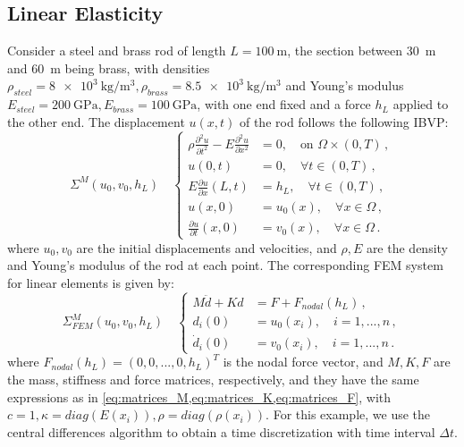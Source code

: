 \documentclass[letterpaper, 10 pt, conference]{ieeeconf/ieeeconf}
\begin{document}
\subsection{Linear Elasticity}
\label{sub:linear_elasticity}

Consider a steel and brass rod of length $L = \SI{100}{\m}$, the section between 
\SI{30}{\m} and \SI{60}{\m} being brass, with densities $\rho_{steel} =
\SI{8e3}{\kg\per\m^3}, \rho_{brass} = \SI{8.5e3}{\kg\per\m^3}$ and Young's
modulus $E_{steel} = \SI{200}{\giga\pascal}, E_{brass} =
\SI{100}{\giga\pascal}$,
with one end fixed and a force $h_L$ applied to the
other end. The displacement $u(x, t)$ of the rod follows the following IBVP:
%
\begin{equation}\label{eq:pde_mech}
    \Sigma^{M}(u_0, v_0, h_L) \quad \left \{
    \begin{aligned}
        \rho \frac{\partial^2 u}{\partial t^2} - E \frac{\partial^2
        u}{\partial x^2} &= 0, \quad \text{on } \Omega \times (0, T) \,, \\
        u(0, t) &= 0, \quad \forall t \in (0, T) \,, \\
        E \frac{\partial u}{\partial x}(L, t) &= h_L, \quad 
        \forall t \in (0, T) \,, \\
        u(x, 0) &= u_0(x), \quad \forall x \in \Omega \,, \\
        \frac{\partial u}{\partial t}(x, 0) &= v_0(x), \quad \forall x \in \Omega \,.
    \end{aligned}
    \right.
\end{equation}
%
where $u_0, v_0$ are the initial displacements and velocities, and $\rho, E$ are
the density and Young's modulus of the rod at each point.
The corresponding FEM system for linear elements is given by:
%
\begin{equation}\label{eq:fem_mech}
    \Sigma^M_{FEM}(u_0, v_0, h_L) \quad \left \{
    \begin{aligned}
        M\ddot{d} + K d &= F + F_{nodal}(h_L) \,, \\
        d_i(0) &= u_0(x_i), \quad i = 1,...,n \,, \\
        \dot{d}_i(0) &= v_0(x_i), \quad i = 1,...,n \,.
    \end{aligned}
    \right.
\end{equation}
%
where $F_{nodal}(h_L) = (0, 0, ..., 0, h_L)^T$ is the nodal force vector, and $M, K, F$ 
are the mass, stiffness and force matrices, respectively, and
they have the same expressions as in
\cref{eq:matrices_M,eq:matrices_K,eq:matrices_F}, with $c = 1, \kappa =
diag(E(x_i)), \rho = diag(\rho(x_i))$.
For this example, we use the central differences algorithm
\cite{hughes_finite_2000} to obtain a time
discretization with time interval $\Delta t$. 
\end{document}
